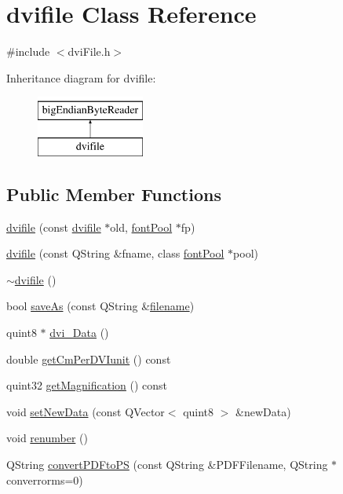 \hypertarget{classdvifile}{\section{dvifile Class Reference}
\label{classdvifile}
}


{\ttfamily \#include $<$dvi\+File.\+h$>$}

Inheritance diagram for dvifile\+:\begin{figure}[H]
\begin{center}
\leavevmode
\includegraphics[height=2.000000cm]{classdvifile}
\end{center}
\end{figure}
\subsection*{Public Member Functions}
\begin{DoxyCompactItemize}
\item 
\hyperlink{classdvifile_ad7b4b8fb4c636ea63a5f2c2365c88d2d}{dvifile} (const \hyperlink{classdvifile}{dvifile} $\ast$old, \hyperlink{classfontPool}{font\+Pool} $\ast$fp)
\item 
\hyperlink{classdvifile_a6c57855429ebd8e59219bad752dcbc60}{dvifile} (const Q\+String \&fname, class \hyperlink{classfontPool}{font\+Pool} $\ast$pool)
\item 
\hyperlink{classdvifile_a3953f1496853ec1043baabe822520ac9}{$\sim$dvifile} ()
\item 
bool \hyperlink{classdvifile_a35300cbcea8a976384273a40b11d704f}{save\+As} (const Q\+String \&\hyperlink{classdvifile_a1c0fe420231e71f256b5db367b7e1178}{filename})
\item 
quint8 $\ast$ \hyperlink{classdvifile_a81f1d32c52377a7b1802072eb40998b7}{dvi\+\_\+\+Data} ()
\item 
double \hyperlink{classdvifile_a59a8b5b2c7b0ae199f4183b6062e6fb0}{get\+Cm\+Per\+D\+V\+Iunit} () const 
\item 
quint32 \hyperlink{classdvifile_a204469b9f242c319ae4918094bd8b062}{get\+Magnification} () const 
\item 
void \hyperlink{classdvifile_a24846cd27de19ba6ddf4a2564c97d8f8}{set\+New\+Data} (const Q\+Vector$<$ quint8 $>$ \&new\+Data)
\item 
void \hyperlink{classdvifile_a11b688d683499aedc28b8cc3537f1ac2}{renumber} ()
\item 
Q\+String \hyperlink{classdvifile_a30569faa8c5a473984363e6a04b2ae62}{convert\+P\+D\+Fto\+P\+S} (const Q\+String \&P\+D\+F\+Filename, Q\+String $\ast$converrorms=0)
\end{DoxyCompactItemize}
